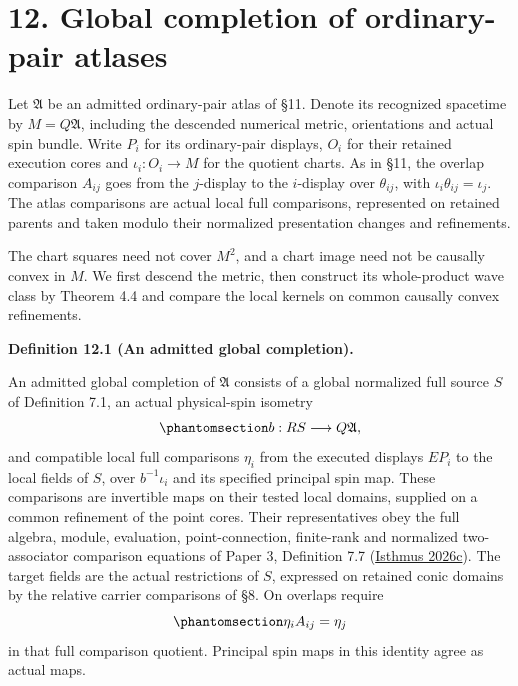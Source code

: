\documentclass[
  english,
  11pt,
  reqno]{amsart}
\makeatletter
\newcommand{\pandocstatementheading}[1]{%
  \par\addpenalty{\@beginparpenalty}%
  \addvspace{.5\baselineskip plus .2\baselineskip minus .2\baselineskip}%
  {\normalfont\bfseries #1\par}%
  \nobreak\@afterindenttrue\@afterheading
}
\makeatother
\begin{document}
\protect{}\label{sec:ordinary-atlas-global-completion}

\section{12. Global completion of ordinary-pair
atlases}\label{global-completion-of-ordinary-pair-atlases}

Let \(\mathfrak A\) be an admitted ordinary-pair atlas of §11. Denote
its recognized spacetime by \(M=Q\mathfrak A\), including the descended
numerical metric, orientations and actual spin bundle. Write \(P_i\) for
its ordinary-pair displays, \(O_i\) for their retained execution cores
and \(\iota_i:O_i\to M\) for the quotient charts. As in §11, the overlap
comparison \(A_{ij}\) goes from the \(j\)-display to the \(i\)-display
over \(\theta_{ij}\), with \(\iota_i\theta_{ij}=\iota_j\). The atlas
comparisons are actual local full comparisons, represented on retained
parents and taken modulo their normalized presentation changes and
refinements.

The chart squares need not cover \(M^2\), and a chart image need not be
causally convex in \(M\). We first descend the metric, then construct
its whole-product wave class by Theorem 4.4 and compare the local
kernels on common causally convex refinements.

\pandocstatementheading{\protect{}\label{def:ordinary-atlas-admitted-completion}Definition 12.1 (An admitted global completion).}

An admitted global completion of \(\mathfrak A\) consists of a global
normalized full source \(S\) of Definition 7.1, an actual physical-spin
isometry
\begin{equation}\protect\phantomsection\label{eq:ordinary-atlas-completion-marking}{
b:RS\longrightarrow Q\mathfrak A,
}\end{equation} and compatible local full comparisons \(\eta_i\) from
the executed displays \(E P_i\) to the local fields of \(S\), over
\(b^{-1}\iota_i\) and its specified principal spin map. These
comparisons are invertible maps on their tested local domains, supplied
on a common refinement of the point cores. Their representatives obey
the full algebra, module, evaluation, point-connection, finite-rank and
normalized two-associator comparison equations of Paper 3, Definition
7.7 (\hyperref[ref-IsthmusSmooth2026]{Isthmus 2026c}). The target fields
are the actual restrictions of \(S\), expressed on retained conic
domains by the relative carrier comparisons of §8. On overlaps require
\begin{equation}\protect\phantomsection\label{eq:ordinary-atlas-completion-overlaps}{
\eta_i A_{ij}=\eta_j
}\end{equation} in that full comparison quotient. Principal spin maps in
this identity agree as actual maps.
\end{document}
